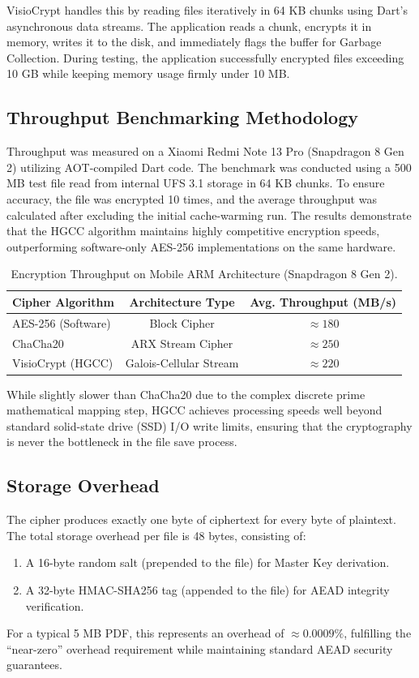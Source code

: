 \documentclass[runningheads]{llncs}
\begin{document}
VisioCrypt handles this by reading files iteratively in 64 KB chunks using Dart's asynchronous data streams. The application reads a chunk, encrypts it in memory, writes it to the disk, and immediately flags the buffer for Garbage Collection. During testing, the application successfully encrypted files exceeding 10 GB while keeping memory usage firmly under 10 MB.

\subsection{Throughput Benchmarking Methodology}
Throughput was measured on a Xiaomi Redmi Note 13 Pro (Snapdragon 8 Gen 2) utilizing AOT-compiled Dart code. The benchmark was conducted using a 500 MB test file read from internal UFS 3.1 storage in 64 KB chunks. To ensure accuracy, the file was encrypted 10 times, and the average throughput was calculated after excluding the initial cache-warming run. The results demonstrate that the HGCC algorithm maintains highly competitive encryption speeds, outperforming software-only AES-256 implementations on the same hardware.

\begin{table}[h]
\centering
\caption{Encryption Throughput on Mobile ARM Architecture (Snapdragon 8 Gen 2).}
\begin{tabular}{lcc}
\toprule
\textbf{Cipher Algorithm} & \textbf{Architecture Type} & \textbf{Avg. Throughput (MB/s)} \\ \midrule
AES-256 (Software)        & Block Cipher               & $\approx 180$                   \\
ChaCha20                  & ARX Stream Cipher           & $\approx 250$                   \\
VisioCrypt (HGCC)         & Galois-Cellular Stream     & $\approx 220$                   \\ \bottomrule
\end{tabular}
\end{table}

While slightly slower than ChaCha20 due to the complex discrete prime mathematical mapping step, HGCC achieves processing speeds well beyond standard solid-state drive (SSD) I/O write limits, ensuring that the cryptography is never the bottleneck in the file save process.

\subsection{Storage Overhead}
The cipher produces exactly one byte of ciphertext for every byte of plaintext. The total storage overhead per file is 48 bytes, consisting of:
\begin{enumerate}
    \item A 16-byte random salt (prepended to the file) for Master Key derivation.
    \item A 32-byte HMAC-SHA256 tag (appended to the file) for AEAD integrity verification.
\end{enumerate}
For a typical 5 MB PDF, this represents an overhead of $\approx 0.0009\%$, fulfilling the ``near-zero'' overhead requirement while maintaining standard AEAD security guarantees.
\end{document}
